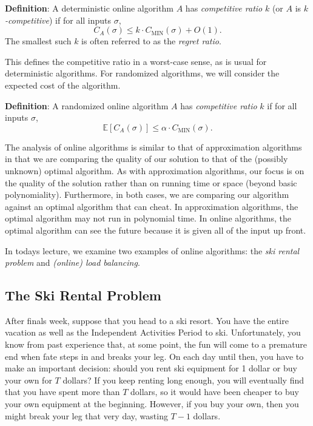 \documentclass{article}
\begin{document}
\textbf{Definition}:
  A deterministic online algorithm $A$ has \emph{competitive ratio} $k$ (or
  $A$ is \emph{$k$-competitive}) if for all inputs $\sigma$,
  $$C_A(\sigma)\leq k\cdot C_{\mathrm{MIN}}(\sigma)+O(1).$$ The smallest such $k$ is often referred to as the \emph{regret ratio}.

This defines the competitive ratio in a worst-case sense, as is
usual for deterministic algorithms. For randomized algorithms, we
will consider the expected cost of the algorithm.

\textbf{Definition}:
  A randomized online algorithm $A$ has \emph{competitive ratio} $k$ if for all inputs $\sigma$,
  $$\mathbb{E}[C_A(\sigma)]\leq \alpha \cdot
  C_{\mathrm{MIN}}(\sigma).$$

The analysis of online algorithms is similar to that of
approximation algorithms in that we are comparing the quality of
our solution to that of the (possibly unknown) optimal algorithm.
As with approximation algorithms, our focus is on the quality of
the solution rather than on running time or space (beyond basic
polynomiality). Furthermore, in both cases, we are comparing our
algorithm against an optimal algorithm that can cheat. In
approximation algorithms, the optimal algorithm may not run in
polynomial time. In online algorithms, the optimal algorithm can
see the future because it is given all of the input up front.

In todays lecture, we examine two examples of online algorithms:
the \emph{ski rental problem} and \emph{(online) load balancing}.

\subsection{The Ski Rental Problem}

After finals week, suppose that you head to a ski resort. You have
the entire vacation as well as the Independent Activities Period
to ski. Unfortunately, you know from past experience that, at some
point, the fun will come to a premature end when fate steps in and
breaks your leg. On each day until then, you have to make an
important decision: should you rent ski equipment for 1 dollar or
buy your own for $T$ dollars? If you keep renting long enough, you
will eventually find that you have spent more than $T$ dollars, so
it would have been cheaper to buy your own equipment at the
beginning. However, if you buy your own, then you might break your
leg that very day, wasting $T-1$ dollars.
\end{document}

